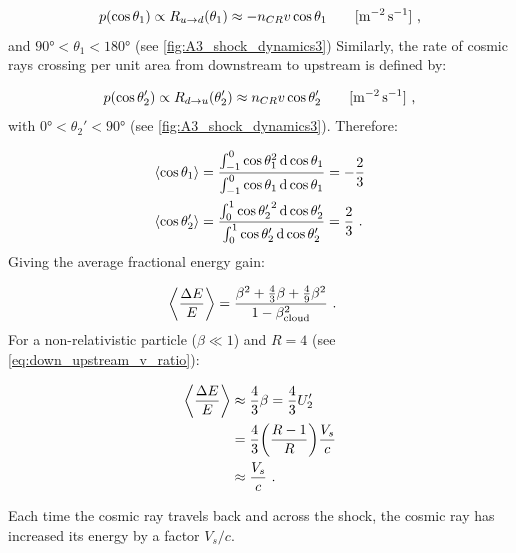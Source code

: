 \begin{equation}
    \begin{aligned}
        p\qty(\cos\theta_1)\propto R_{u\rightarrow d}\qty(\theta_1)&\approx-n_{CR}v\cos\theta_1\quad &[\si{\per\meter\squared\per\second}]\text{ ,}
    \end{aligned}
\end{equation}
\noindent and $\ang{90}<\theta_1<\ang{180}$ (see \autoref{fig:A3_shock_dynamics3}) Similarly, the rate of cosmic rays crossing per unit area from downstream to upstream is defined by:

\begin{equation}
    \begin{aligned}
p\qty(\cos\theta_2')\propto R_{d\rightarrow u}\qty(\theta_2')&\approx n_{CR}v\cos\theta_2'\quad&[\si{\per\meter\squared\per\second} ]\text{ ,}
    \end{aligned}
\end{equation}
\noindent with $\ang{0}<\theta_2'<\ang{90}$ (see \autoref{fig:A3_shock_dynamics3}). Therefore:

\begin{equation}
    \begin{aligned}
    \left\langle \cos\theta_1 \right\rangle&=\frac{\int_{-1}^{0} \cos\theta_1^2\dd{\cos\theta_1}}{\int_{-1}^{0}\cos\theta_1 \dd{\cos\theta_1}}=-\frac{2}{3} \\
    \left\langle \cos\theta_2' \right\rangle&=\frac{\int_{0}^{1} {\cos\theta_2'}^2\dd{\cos\theta_2'}}{\int_{0}^{1}\cos\theta_2' \dd{\cos\theta_2'}}=\frac{2}{3}\text{ .}
    \end{aligned} 
\end{equation}
\noindent Giving the average fractional energy gain:

\begin{equation}
    \begin{aligned}
    \left\langle \frac{\Delta E}{E} \right\rangle
	&=\frac{\beta^2+\frac{4}{3}\beta+\frac{4}{9}\beta^2}{1-\beta_\text{cloud}^2}\text{ .}
    \end{aligned} 
\end{equation}
\noindent For a non-relativistic particle ($\beta\ll 1$) and $R=4$ (see \autoref{eq:down_upstream_v_ratio}):

\begin{equation}
    \begin{aligned}
    \left\langle \frac{\Delta E}{E} \right\rangle
	&\approx \frac{4}{3}\beta =\frac{4}{3}U_2'  \\
    &=\frac{4}{3}\qty(\frac{R-1}{R})\frac{V_s}{c} \\
    &\approx \frac{V_s}{c}\text{ .}
    \end{aligned} 
\end{equation}

Each time the cosmic ray travels back and across the shock, the cosmic ray has increased its energy by a factor $V_s/c$.